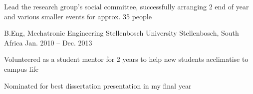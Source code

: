 \documentclass[11pt,a4paper]{awesome-cv}        %
\begin{document}
\begin{cventries}
{\begin{cvitems}
      \item Lead the research  group's social committee, successfully arranging 2 end of year and various smaller events for approx. 35 people
    \end{cvitems}
  }
  \cventry
  {B.Eng, Mechatronic Engineering}
  {Stellenbosch University}
  {Stellenbosch, South Africa}
  {Jan. 2010 -- Dec. 2013}
  {
    \begin{cvitems}
      \item Volunteered as a student mentor for 2 years to help new students acclimatise to campus life
      \item Nominated for best dissertation presentation in my final year
    \end{cvitems}
  }  
\end{cventries}

\end{document}
